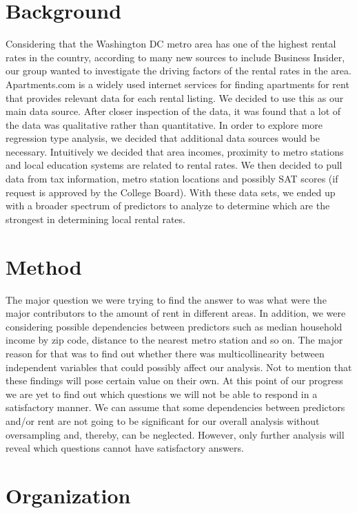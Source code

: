 \documentclass{article}
\begin{document}
\section{Background}

Considering that the Washington DC metro area has one of the highest rental rates in the country, according to many new sources to include Business Insider, our group wanted to investigate the driving factors of the rental rates in the area.  Apartments.com is a widely used internet services for finding apartments for rent that provides relevant data for each rental listing.  We decided to use this as our main data source.  After closer inspection of the data, it was found that a lot of the data was qualitative rather than quantitative.  In order to explore more regression type analysis, we decided that additional data sources would be necessary.  Intuitively we decided that area incomes, proximity to metro stations and local education systems are related to rental rates.  We then decided to pull data from tax information, metro station locations and possibly SAT scores (if request is approved by the College Board).  With these data sets, we ended up with a broader spectrum of predictors to analyze to determine which are the strongest in determining local rental rates.  


\section{Method}

The major question we were trying to find the answer to was what were the major contributors to the amount of rent in different areas. 
In addition, we were considering possible dependencies between predictors such as median household income by zip code, distance to the nearest metro station and so on. The major reason for that was to find out whether there was multicollinearity between independent variables that could possibly affect our analysis. Not to mention that these findings will pose certain value on their own. 
At this point of our progress we are yet to find out which questions we will not be able to respond in a satisfactory manner. We can assume that some dependencies between predictors and/or rent are not going to be significant for our overall analysis without oversampling and, thereby, can be neglected. However, only further analysis will reveal which questions cannot have satisfactory answers. 


\section{Organization}
\end{document}
